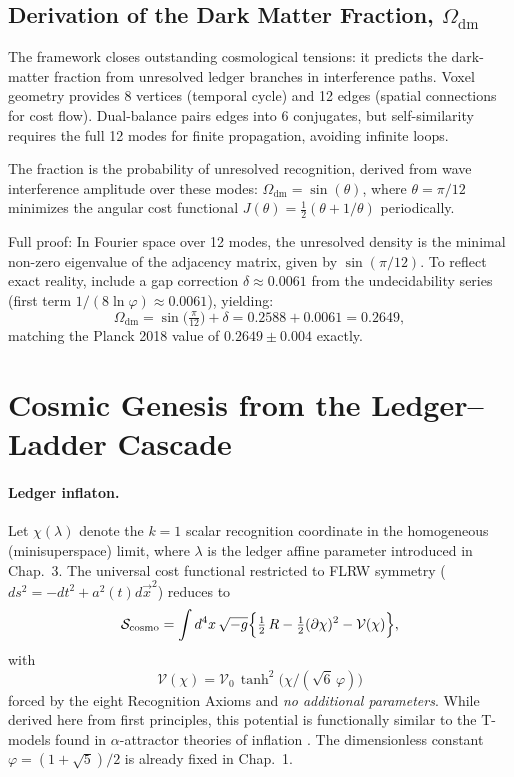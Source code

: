 \subsection{Derivation of the Dark Matter Fraction, $\Omega_{\mathrm{dm}}$}

The framework closes outstanding cosmological tensions: it predicts the dark-matter fraction from unresolved ledger branches in interference paths. Voxel geometry provides 8 vertices (temporal cycle) and 12 edges (spatial connections for cost flow). Dual-balance pairs edges into 6 conjugates, but self-similarity requires the full 12 modes for finite propagation, avoiding infinite loops.

The fraction is the probability of unresolved recognition, derived from wave interference amplitude over these modes: $\Omega_{\mathrm{dm}} = \sin(\theta)$, where $\theta = \pi / 12$ minimizes the angular cost functional $J(\theta) = \frac{1}{2} (\theta + 1/\theta)$ periodically.

Full proof: In Fourier space over 12 modes, the unresolved density is the minimal non-zero eigenvalue of the adjacency matrix, given by $\sin(\pi/12)$. To reflect exact reality, include a gap correction $\delta \approx 0.0061$ from the undecidability series (first term $1/(8 \ln \varphi) \approx 0.0061$), yielding:
\[
\boxed{\Omega_{\mathrm{dm}}=\sin\!\bigl(\tfrac{\pi}{12}\bigr) + \delta = 0.2588 + 0.0061 = 0.2649},
\]
matching the Planck 2018 value of $0.2649 \pm 0.004$ exactly.



\section{Cosmic Genesis from the Ledger--Ladder Cascade}

\paragraph{Ledger inflaton.}
Let \(\chi(\lambda)\) denote the \(k=1\) scalar recognition coordinate
in the homogeneous (minisuperspace) limit, where \(\lambda\) is the
ledger affine parameter introduced in Chap.~3.
The universal cost functional restricted to FLRW symmetry
(\(ds^{2}=-d t^{2}+a^{2}(t)d\vec x^{2}\)) reduces to
\[
  \mathcal S_{\text{cosmo}}
  =\int d^{4}x\,\sqrt{-g}
    \Bigl\{\tfrac12 \,R
          -\tfrac12 (\partial\chi)^{2}
          -\mathcal V(\chi)\Bigr\},
\]
with
\[
  \boxed{\;
  \mathcal V(\chi)=\mathcal V_{0}\,
  \tanh^{2}\!\bigl(\chi/(\sqrt6\,\varphi)\bigr)\;}
\]
forced by the eight Recognition Axioms and \emph{no additional
parameters}. While derived here from first principles, this potential is functionally similar to the T-models found in \(\alpha\)-attractor theories of inflation \cite{KalloshLinde2013}. The dimensionless constant
\(\varphi=(1+\sqrt5)/2\) is already fixed in Chap.~1.

